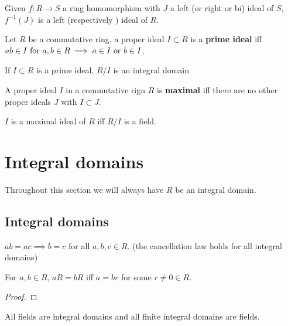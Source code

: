 \documentclass[../Year2.tex]{subfiles}
\begin{document}
\begin{proposition}
    Given $f:R\rightarrow S$ a ring homomorphism with $J$ a left (or right or bi) ideal of $S$, $f^{-1}(J)$ is a left (respectively ) ideal of $R$.
\end{proposition}

\begin{definition}
    Let $R$ be a commutative ring, a proper ideal $I\subset R$ is a \textbf{prime ideal} iff $ab\in I \ \text{\textcolor{black}{for }} a,b\in R \implies a\in I \ \text{\textcolor{black}{or }} b\in I$.
\end{definition}

\begin{theorem}
    If $I\subset R$ is a prime ideal, $R/I$ is an integral domain
\end{theorem}

\begin{definition}
    A proper ideal $I$ in a commutative rign $R$ is \textbf{maximal} iff there are no other proper ideals $J$ with $I\subset J$.
\end{definition}

\begin{theorem}
    $I$ is a maximal ideal of $R$ iff $R/I$ is a field.
\end{theorem}

\section{Integral domains}
Throughout this section we will always have $R$ be an integral domain.

\subsection{Integral domains}

\begin{theorem}
    $ab=ac\implies b=c$ for all $a,b,c\in R$. (the cancellation law holds for all integral domains)
\end{theorem}

\begin{proposition}
    For $a,b\in R$, $aR=bR$ iff $a=br$ for some $r\neq 0 \in R$.
    \begin{proof}
        
    \end{proof}
\end{proposition}

\begin{theorem}
    All fields are integral domains and all finite integral domains are fields.
\end{theorem}
\end{document}
